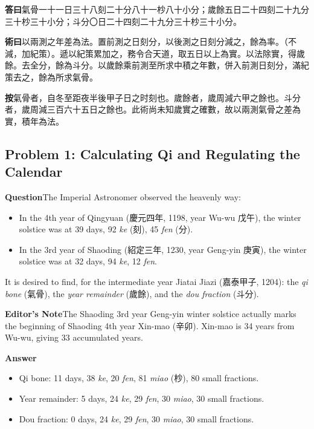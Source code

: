 \documentclass[11pt,a4paper]{article}
\newcommand{\DaCN}{\textbf{\color{headcolor}答曰}}
\newcommand{\ShuCN}{\textbf{\color{headcolor}術曰}}
\newcommand{\AnCN}{\textbf{\color{headcolor}按}}
\newcommand{\WenEN}{\textbf{\color{headcolor}Question}}
\newcommand{\DaEN}{\textbf{\color{headcolor}Answer}}
\newcommand{\AnEN}{\textbf{\color{headcolor}Editor's Note}}
\begin{document}
\vspace{0.5em}
\DaCN{}\quad 氣骨一十一日三十八刻二十分八十一杪八十小分；歲餘五日二十四刻二十九分三十杪三十小分；斗分〇日二十四刻二十九分三十杪三十小分。

\vspace{0.5em}
\ShuCN{}\quad 以兩測之年差為法。置前測之日刻分，以後測之日刻分減之，餘為率。（不減，加紀策）。遞以紀策累加之，務令合天道，取五日以上為實。以法除實，得歲餘。去全分，餘為斗分。以歲餘乘前測至所求中積之年數，併入前測日刻分，滿紀策去之，餘為所求氣骨。

\vspace{0.5em}
\AnCN{}\quad 氣骨者，自冬至距夜半後甲子日之时刻也。歲餘者，歲周減六甲之餘也。斗分者，歲周減三百六十五日之餘也。此術尚未知歲實之確數，故以兩測氣骨之差為實，積年為法。

\switchcolumn[1]
\subsection*{Problem 1: Calculating Qi and Regulating the Calendar}
\label{sec:tuiqizhili}

\vspace{0.5em}
\WenEN{}\quad The Imperial Astronomer observed the heavenly way:
\begin{itemize}[noitemsep,topsep=0pt]
  \item In the 4th year of Qingyuan (慶元四年, 1198, year Wu-wu 戊午), the winter solstice was at 39 days, 92 \textit{ke} (刻), 45 \textit{fen} (分).
  \item In the 3rd year of Shaoding (紹定三年, 1230, year Geng-yin 庚寅), the winter solstice was at 32 days, 94 \textit{ke}, 12 \textit{fen}.
\end{itemize}
It is desired to find, for the intermediate year Jiatai Jiazi (嘉泰甲子, 1204): the \textit{qi bone} (氣骨), the \textit{year remainder} (歲餘), and the \textit{dou fraction} (斗分).

\vspace{0.5em}
\AnEN{}\quad The Shaoding 3rd year Geng-yin winter solstice actually marks the beginning of Shaoding 4th year Xin-mao (辛卯). Xin-mao is 34 years from Wu-wu, giving 33 accumulated years.

\vspace{0.5em}
\DaEN{}\quad
\begin{itemize}[noitemsep,topsep=0pt]
  \item Qi bone: 11 days, 38 \textit{ke}, 20 \textit{fen}, 81 \textit{miao} (杪), 80 small fractions.
  \item Year remainder: 5 days, 24 \textit{ke}, 29 \textit{fen}, 30 \textit{miao}, 30 small fractions.
  \item Dou fraction: 0 days, 24 \textit{ke}, 29 \textit{fen}, 30 \textit{miao}, 30 small fractions.
\end{itemize}
\end{document}
